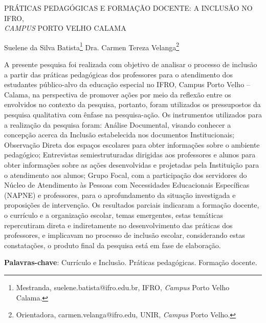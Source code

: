 \documentclass[article,12pt,onesidea,4paper,english,brazil]{abntex2}
\begin{document}
	
	
	\frenchspacing 
	
	\begin{center}
		\LARGE PRÁTICAS PEDAGÓGICAS E FORMAÇÃO DOCENTE: A INCLUSÃO NO IFRO,\\ \textit{CAMPUS} PORTO VELHO CALAMA
		
		\normalsize
		Suelene da Silva Batista\footnote{Mestranda, suelene.batista@ifro.edu.br, IFRO, \textit{Campus} Porto Velho Calama.} 
		Dra. Carmen Tereza Velanga\footnote{Orientadora, carmen.velanga@ifro.edu, UNIR, \textit{Campus} Porto Velho.} 
	\end{center}
	
	\noindent A presente pesquisa foi realizada com objetivo de analisar o processo de inclusão a
	partir das práticas pedagógicas dos professores para o atendimento dos estudantes
	público-alvo da educação especial no IFRO, Campus Porto Velho – Calama, na
	perspectiva de promover ações por meio da reflexão entre os envolvidos no contexto
	da pesquisa, portanto, foram utilizados os pressupostos da pesquisa qualitativa com
	ênfase na pesquisa-ação. Os instrumentos utilizados para a realização da pesquisa
	foram: Análise Documental, visando conhecer a concepção acerca da Inclusão
	estabelecida nos documentos Institucionais; Observação Direta dos espaços
	escolares para obter informações sobre o ambiente pedagógico; Entrevistas
	semiestruturadas dirigidas aos professores e alunos para obter informações sobre
	as ações desenvolvidas e projetadas pela Instituição para o atendimento aos alunos;
	Grupo Focal, com a participação dos servidores do Núcleo de Atendimento às
	Pessoas com Necessidades Educacionais Específicas (NAPNE) e professores, para
	o aprofundamento da situação investigada e proposições de intervenção. Os
	resultados parciais indicaram a formação docente, o currículo e a organização
	escolar, temas emergentes, estas temáticas repercutiram direta e indiretamente no
	desenvolvimento das práticas dos professores, e implicavam no processo de
	inclusão escolar, considerando estas constatações, o produto final da pesquisa está
	em fase de elaboração.
	
	\vspace{\onelineskip}
	
	\noindent
	\textbf{Palavras-chave}: Currículo e Inclusão. Práticas pedagógicas. Formação docente.
	
\end{document}

